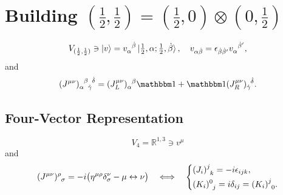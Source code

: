 \section{\texorpdfstring{Building $(\frac{1}{2}, \frac{1}{2}) = (\frac{1}{2}, 0) \otimes (0, \frac{1}{2})$}{Building (1/2,1/2) = (1/2,0) x (0,1/2)}}
\begin{equation}
    V_{(\frac{1}{2}, \frac{1}{2})} \ni \ket{v} = \tensor{v}{_\alpha^{\dot\beta}} \ket{\tfrac{1}{2}, \alpha; \tfrac{1}{2}, \dot\beta}, \quad v_{\alpha \dot{\beta}} = \epsilon_{\dot\beta \dot\beta'} \tensor{v}{_\alpha^{\dot\beta'}},
\end{equation}
and
\begin{equation}
    \tensor{(J^{\mu \nu})}{_\alpha^\beta_{\dot\gamma}^{\dot\delta}} = \tensor{(J_L^{\mu \nu})}{_\alpha^\beta} \id + \id \tensor{(J_R^{\mu \nu})}{_{\dot\gamma}^{\dot\delta}}.
\end{equation}
\subsection{Four-Vector Representation}
\begin{equation}
    V_4 = \mathbb R^{1, 3} \ni v^\mu
\end{equation}
and
\begin{equation}
    \tensor{(J^{\mu \nu})}{^\rho_\sigma} = - i \bigl(\eta^{\mu \rho} \delta^\nu_\sigma - \mu \leftrightarrow \nu \bigr) \quad \Longleftrightarrow \quad
    \begin{dcases}
        \tensor{(J_i)}{^j_k} = - i \epsilon_{i j k}, \\
        \tensor{(K_i)}{^0_j} = i \delta_{i j} = \tensor{(K_i)}{^j_0}.
    \end{dcases} \label{Four-vector representation}
\end{equation}
